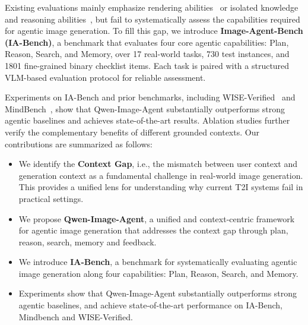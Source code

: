 Existing evaluations mainly emphasize rendering abilities~\citep{Ghosh2023GenEvalAO, Hu2024ELLAED} or isolated knowledge and reasoning abilities~\citep{Niu2025WISEAW, Zhao2025EnvisioningBT}, but fail to systematically assess the capabilities required for agentic image generation. To fill this gap, we introduce \textbf{Image-Agent-Bench (IA-Bench)}, a benchmark that evaluates four core agentic capabilities: Plan, Reason, Search, and Memory, over 17 real-world tasks, 730 test instances, and 1801 fine-grained binary checklist items. Each task is paired with a structured VLM-based evaluation protocol for reliable assessment.

Experiments on IA-Bench and prior benchmarks, including WISE-Verified~\citep{Niu2025WISEAW} and MindBench~\citep{He2026MindBrushIA}, show that Qwen-Image-Agent substantially outperforms strong agentic baselines and achieves state-of-the-art results. Ablation studies further verify the complementary benefits of different grounded contexts. Our contributions are summarized as follows:
\begin{itemize}[leftmargin=*, itemsep=2pt, topsep=2pt, parsep=0pt, partopsep=0pt]
\item We identify the \textbf{Context Gap}, i.e., the mismatch between user context and generation context as a fundamental challenge in real-world image generation. This provides a unified lens for understanding why current T2I systems fail in practical settings.
\item We propose \textbf{Qwen-Image-Agent}, a unified and context-centric framework for agentic image generation that addresses the context gap through plan, reason, search, memory and feedback.
\item We introduce \textbf{IA-Bench}, a benchmark for systematically evaluating agentic image generation along four capabilities: Plan, Reason, Search, and Memory.
\item Experiments show that Qwen-Image-Agent substantially outperforms strong agentic baselines, and achieve state-of-the-art performance on IA-Bench, Mindbench and WISE-Verified.
\end{itemize}
